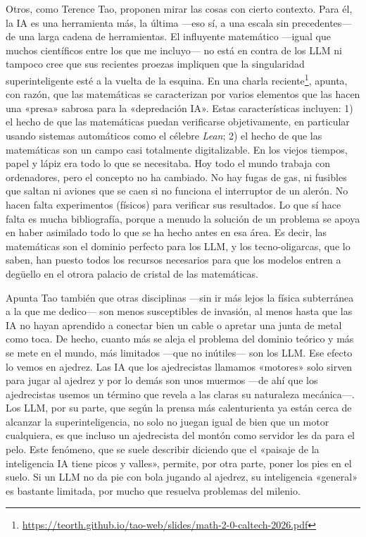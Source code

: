 \documentclass[11pt,a4paper]{article}
\begin{document}
Otros, como Terence Tao, proponen mirar las cosas con cierto contexto. Para él, la IA es una herramienta más, la última ---eso sí, a una escala sin precedentes--- de una larga cadena de herramientas. El influyente matemático ---igual que muchos científicos entre los que me incluyo--- no está en contra de los LLM ni tampoco cree que sus recientes proezas impliquen que la singularidad superinteligente esté a la vuelta de la esquina. En una charla reciente\footnote{\url{https://teorth.github.io/tao-web/slides/math-2-0-caltech-2026.pdf}}, apunta, con razón, que las matemáticas se caracterizan por varios elementos que las hacen una «presa» sabrosa para la «depredación IA». Estas características incluyen: 1) el hecho de que las matemáticas puedan verificarse objetivamente, en particular usando sistemas automáticos como el célebre \emph{Lean}; 2) el hecho de que las matemáticas son un campo casi totalmente digitalizable. En los viejos tiempos, papel y lápiz era todo lo que se necesitaba. Hoy todo el mundo trabaja con ordenadores, pero el concepto no ha cambiado. No hay fugas de gas, ni fusibles que saltan ni aviones que se caen si no funciona el interruptor de un alerón. No hacen falta experimentos (físicos) para verificar sus resultados. Lo que sí hace falta es mucha bibliografía, porque a menudo la solución de un problema se apoya en haber asimilado todo lo que se ha hecho antes en esa área. Es decir, las matemáticas son el dominio perfecto para los LLM, y los tecno-oligarcas, que lo saben, han puesto todos los recursos necesarios para que los modelos entren a degüello en el otrora palacio de cristal de las matemáticas. 

Apunta Tao también que otras disciplinas ---sin ir más lejos la física subterránea a la que me dedico--- son menos susceptibles de invasión, al menos hasta que las IA no hayan aprendido a conectar bien un cable o apretar una junta de metal como toca. De hecho, cuanto más se aleja el problema del dominio teórico y más se mete en el mundo, más limitados ---que no inútiles--- son los LLM. Ese efecto lo vemos en ajedrez. Las IA que los ajedrecistas llamamos «motores» solo sirven para jugar al ajedrez y por lo demás son unos muermos ---de ahí que los ajedrecistas usemos un término que revela a las claras su naturaleza mecánica---. Los LLM, por su parte, que según la prensa más calenturienta ya están cerca de alcanzar la superinteligencia, no solo no juegan igual de bien que un motor cualquiera, es que incluso un ajedrecista del montón como servidor les da para el pelo. Este fenómeno, que se suele describir diciendo que el «paisaje de la inteligencia IA tiene picos y valles», permite, por otra parte, poner los pies en el suelo. Si un LLM no da pie con bola jugando al ajedrez, su inteligencia «general» es bastante limitada, por mucho que resuelva problemas del milenio. 
\end{document}
